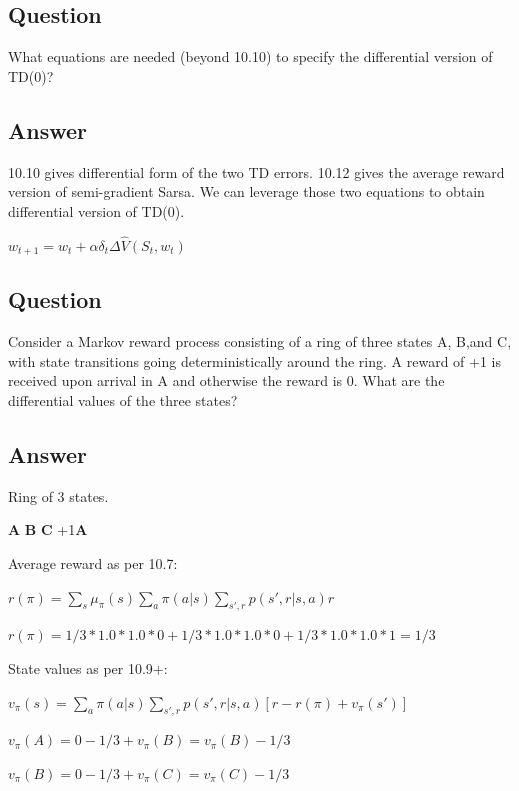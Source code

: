\documentclass[11pt]{article}
\begin{document}
    \subsection{Question}

    What equations are needed (beyond 10.10) to specify the differential version of TD(0)?

    \subsection*{Answer}

    10.10 gives differential form of the two TD errors.
    10.12 gives the average reward version of semi-gradient Sarsa.
    We can leverage those two equations to obtain differential version of TD(0).

    $ w_{t+1} = w_t + \alpha \delta_t \Delta \hat{V}(S_t,w_t) $

    \subsection{Question}

    Consider a Markov reward process consisting of a ring of three states A, B,and C, with state transitions going deterministically around the ring.
    A reward of +1 is received upon arrival in A and otherwise the reward is 0.
    What are the differential values of the three states?

    \subsection*{Answer}

    Ring of 3 states.

   \textbf{A} \rightarrow \textbf{B} \rightarrow \textbf{C} \rightarrow+1\rightarrow \textbf{A}

    \noindent Average reward as per 10.7:

    $ r(\pi) = \sum_{s} \mu_{\pi}(s) \sum_{a} \pi(a|s) \sum_{s',r}{p(s',r|s,a)} r $

    $ r(\pi) = 1/3 * 1.0 * 1.0 * 0 + 1/3 * 1.0 * 1.0 * 0 + 1/3 * 1.0 * 1.0 * 1 = 1/3 $

    \noindent State values as per 10.9+:

    $ v_\pi(s) = \sum_{a} \pi(a|s) \sum_{s',r}{p(s',r|s,a)} [r - r(\pi) + v_\pi(s') ] $

    $ v_\pi(A) =  0 - 1/3 + v_\pi(B) = v_\pi(B) - 1/3 $

    $ v_\pi(B) =  0 - 1/3 + v_\pi(C) = v_\pi(C) - 1/3 $
\end{document}
